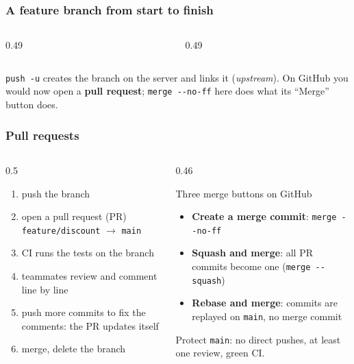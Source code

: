 \documentclass[aspectratio=169,10pt,compress]{beamer}
\begin{document}
\begin{frame}[t,fragile] \frametitle{A feature branch from start to finish}
  \begin{columns}[T]
    \begin{column}{0.49\textwidth}
    \end{column}
    \begin{column}{0.49\textwidth}
    \end{column}
  \end{columns}

  \vspace{0.1em}
  \small
  \texttt{push -u} creates the branch on the server and links it (\emph{upstream}). On GitHub you would now open a \textbf{pull request};
  \texttt{merge -{}-no-ff} here does what its ``Merge'' button does.
\end{frame}




\begin{frame}[t,fragile] \frametitle{Pull requests}
  \begin{columns}[T]
    \begin{column}{0.5\textwidth}
      \begin{enumerate}\small
        \item push the branch
        \item open a pull request (PR) \texttt{feature/discount} $\to$ \texttt{main}
        \item CI runs the tests on the branch
        \item teammates review and comment line by line
        \item push more commits to fix the comments: the PR updates itself
        \item merge, delete the branch
      \end{enumerate}
    \end{column}
    \begin{column}{0.46\textwidth}
      \begin{block}{Three merge buttons on GitHub}
        \small
        \begin{itemize}
          \item \textbf{Create a merge commit}: \texttt{merge -{}-no-ff}
          \item \textbf{Squash and merge}: all PR commits become one (\texttt{merge -{}-squash})
          \item \textbf{Rebase and merge}: commits are replayed on \texttt{main}, no merge commit
        \end{itemize}
      \end{block}
      \small Protect \texttt{main}: no direct pushes, at least one review, green CI.
    \end{column}
  \end{columns}
\end{frame}
\end{document}
